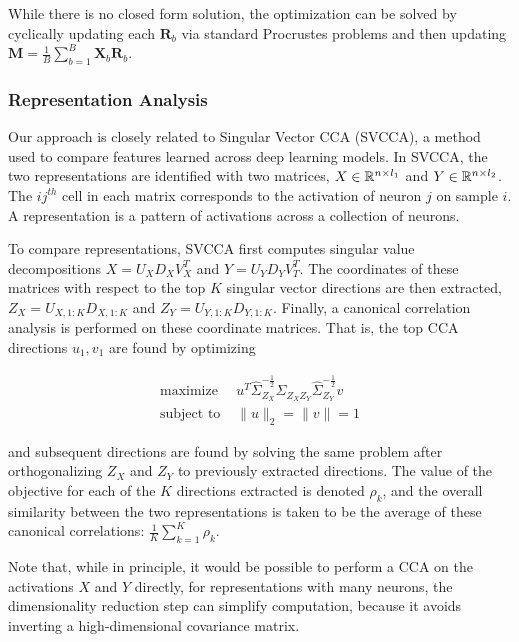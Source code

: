 While there is no closed form solution, the optimization can be solved by
cyclically updating each $\mathbf{R}_{b}$ via standard Procrustes problems and
then updating $\mathbf{M} = \frac{1}{B} \sum_{b = 1}^{B} \mathbf{X}_{b}
\mathbf{R}_{b}$.

\subsubsection{Representation Analysis}

Our approach is closely related to Singular Vector CCA (SVCCA), a method used to
compare features learned across deep learning models. In SVCCA, the two
representations are identified with two matrices, $X \in \mathbb{R}^{n \times
  l_{1}}$ and $Y \in \mathbb{R}^{n \times l_{2}}$. The $ij^{th}$ cell in each matrix
corresponds to the activation of neuron $j$ on sample $i$. A representation is a
pattern of activations across a collection of neurons.

To compare representations, SVCCA first computes singular value decompositions
$X = U_{X}D_{X}V_{X}^{T}$ and $Y = U_{Y}D_{Y}V_{T}^{T}$. The coordinates of
these matrices with respect to the top $K$ singular vector directions are then
extracted, $Z_{X} = U_{X, 1:K}D_{X, 1:K}$ and $Z_{Y} = U_{Y, 1:K}D_{Y, 1:K}$.
Finally, a canonical correlation analysis is performed on these coordinate
matrices. That is, the top CCA directions $u_{1}, v_{1}$ are found by optimizing

\begin{align*}
  \text{maximize }& u^{T}\hat{\Sigma}_{Z_{X}}^{-\frac{1}{2}}\hat{\Sigma}_{Z_{X}Z_{Y}}\hat{\Sigma}_{Z_{Y}}^{-\frac{1}{2}}v \\
  \text{subject to } & \|u\|_{2} = \|v\| = 1
\end{align*}

and subsequent directions are found by solving the same problem after
orthogonalizing $Z_{X}$ and $Z_{Y}$ to previously extracted directions. The
value of the objective for each of the $K$ directions extracted is denoted
$\rho_{k}$, and the overall similarity between the two representations is taken
to be the average of these canonical correlations: $\frac{1}{K}\sum_{k = 1}^{K}
\rho_{k}$.

Note that, while in principle, it would be possible to perform a CCA on the
activations $X$ and $Y$ directly, for representations with many neurons, the
dimensionality reduction step can simplify computation, because it avoids
inverting a high-dimensional covariance matrix.

